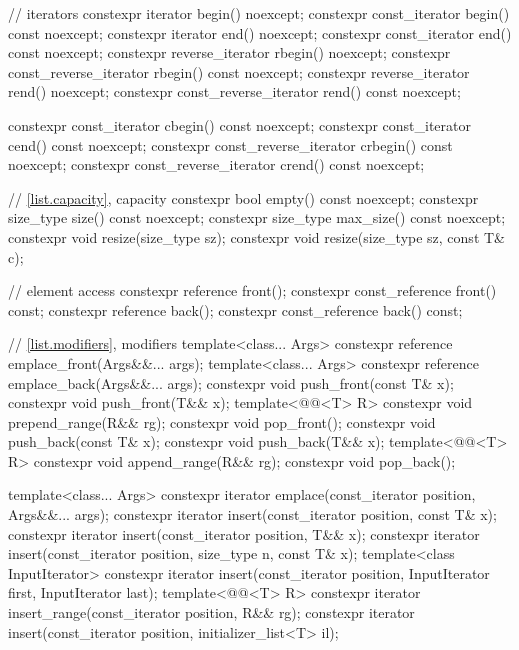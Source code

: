 \begin{codeblock}
{{    // iterators
    constexpr iterator               begin() noexcept;
    constexpr const_iterator         begin() const noexcept;
    constexpr iterator               end() noexcept;
    constexpr const_iterator         end() const noexcept;
    constexpr reverse_iterator       rbegin() noexcept;
    constexpr const_reverse_iterator rbegin() const noexcept;
    constexpr reverse_iterator       rend() noexcept;
    constexpr const_reverse_iterator rend() const noexcept;

    constexpr const_iterator         cbegin() const noexcept;
    constexpr const_iterator         cend() const noexcept;
    constexpr const_reverse_iterator crbegin() const noexcept;
    constexpr const_reverse_iterator crend() const noexcept;

    // \ref{list.capacity}, capacity
    constexpr bool empty() const noexcept;
    constexpr size_type size() const noexcept;
    constexpr size_type max_size() const noexcept;
    constexpr void      resize(size_type sz);
    constexpr void      resize(size_type sz, const T& c);

    // element access
    constexpr reference       front();
    constexpr const_reference front() const;
    constexpr reference       back();
    constexpr const_reference back() const;

    // \ref{list.modifiers}, modifiers
    template<class... Args> constexpr reference emplace_front(Args&&... args);
    template<class... Args> constexpr reference emplace_back(Args&&... args);
    constexpr void push_front(const T& x);
    constexpr void push_front(T&& x);
    template<@@<T> R>
      constexpr void prepend_range(R&& rg);
    constexpr void pop_front();
    constexpr void push_back(const T& x);
    constexpr void push_back(T&& x);
    template<@@<T> R>
      constexpr void append_range(R&& rg);
    constexpr void pop_back();

    template<class... Args> constexpr iterator emplace(const_iterator position, Args&&... args);
    constexpr iterator insert(const_iterator position, const T& x);
    constexpr iterator insert(const_iterator position, T&& x);
    constexpr iterator insert(const_iterator position, size_type n, const T& x);
    template<class InputIterator>
      constexpr iterator insert(const_iterator position,
                                InputIterator first, InputIterator last);
    template<@@<T> R>
      constexpr iterator insert_range(const_iterator position, R&& rg);
    constexpr iterator insert(const_iterator position, initializer_list<T> il);

}}
\end{codeblock}

